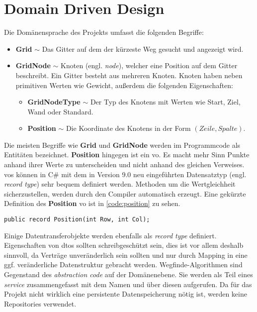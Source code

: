 \part{Domain Driven Design}
Die Domänensprache des Projekts umfasst die folgenden Begriffe:
\begin{itemize}
      \item \textbf{Grid} $\sim$ Das Gitter auf dem der kürzeste Weg gesucht und
            angezeigt wird.
      \item \textbf{GridNode} $\sim$ Knoten (engl. \textit{node}),
            welcher eine Position auf dem Gitter beschreibt. Ein
            Gitter besteht aus mehreren Knoten. Knoten haben neben
            primitiven Werten wie Gewicht, außerdem die
            folgenden Eigenschaften:
            \begin{itemize}[topsep=0pt]
                  \item \textbf{GridNodeType} $\sim$ Der Typ des Knotens mit Werten
                        wie Start, Ziel, Wand oder Standard.
                  \item \textbf{Position} $\sim$ Die Koordinate des Knotens in der
                        Form $(Zeile,Spalte)$.
            \end{itemize}
\end{itemize}
Die meisten Begriffe wie \textbf{Grid} und \textbf{GridNode} werden
im Programmcode als Entitäten bezeichnet.
\textbf{Position} hingegen ist ein \ac{vo}. Es macht mehr Sinn Punkte anhand ihrer
Werte zu unterscheiden und nicht anhand des gleichen Verweises.
\acp{vo} können in C\# mit dem in Version 9.0 neu eingeführten
Datensatztyp (engl. \textit{record type}) sehr bequem definiert werden.
Methoden um die Wertgleichheit sicherzustellen,
werden durch den Compiler automatisch erzeugt.
Eine gekürzte Definition des \textbf{Position} \ac{vo} ist in \autoref{code:position}
zu sehen.
\begin{lstlisting}[caption={Der Datensatztyp einer Koordinate},label={code:position}]
public record Position(int Row, int Col);
\end{lstlisting}
Einige Datentransferobjekte werden ebenfalls als \textit{record type} definiert.
Eigenschaften von \acp{dto} sollten schreibgeschützt sein,
dies ist vor allem deshalb sinnvoll, da Verträge un\-veränderlich sein sollten
und nur durch Mapping in eine ggf. veränderliche Datenstruktur gebracht werden.
Wegfinde-Algorithmen sind Gegenstand des \textit{abstraction code} auf
der Domänenebene. Sie werden als Teil eines \textit{service}
zusammengefasst mit dem Namen  und
über diesen aufgerufen. Da für das Projekt nicht wirklich
eine persistente Datenspeicherung nötig ist, werden keine
Repositories verwendet.